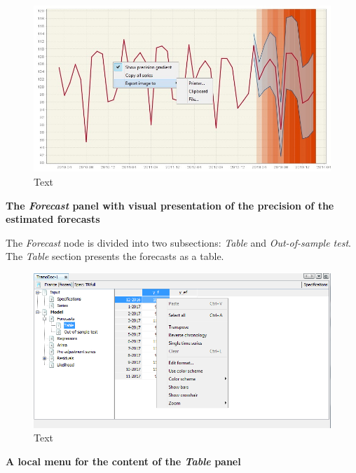 \documentclass[
  letterpaper,
  DIV=11,
  numbers=noendperiod]{scrreprt}
\begin{document}
\begin{figure}

{\centering \includegraphics{./All_images/image42_RMSB.jpg}

}

\caption{Text}

\end{figure}

\textbf{The \emph{Forecast} panel with visual presentation of the
precision of the estimated forecasts}

The \emph{Forecast} node is divided into two subsections: \emph{Table}
and \emph{Out-of-sample test}. The \emph{Table} section presents the
forecasts as a table.

\begin{figure}

{\centering \includegraphics{./All_images/image43_RMSB.png}

}

\caption{Text}

\end{figure}

\textbf{A local menu for the content of the \emph{Table} panel}
\end{document}
